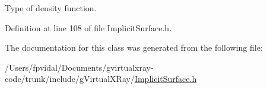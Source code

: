 Type of density function. 



Definition at line 108 of file ImplicitSurface.h.



The documentation for this class was generated from the following file:\begin{DoxyCompactItemize}
\item 
/Users/fpvidal/Documents/gvirtualxray-\/code/trunk/include/gVirtualXRay/\hyperlink{_implicit_surface_8h}{ImplicitSurface.h}\end{DoxyCompactItemize}

